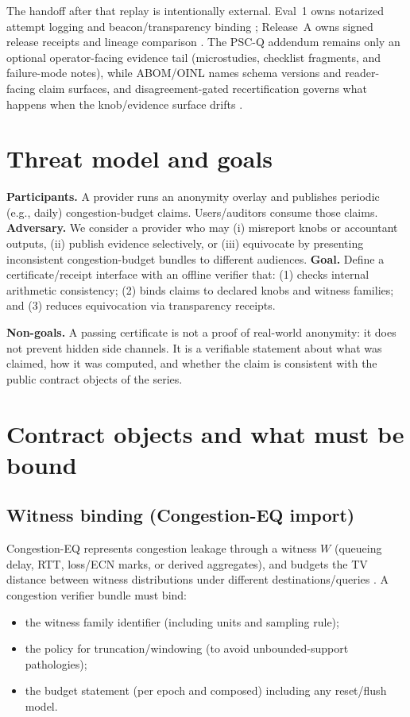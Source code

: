 \documentclass[11pt]{article}
\begin{document}
The handoff after that replay is intentionally external.
Eval~1 owns notarized attempt logging and beacon/transparency binding \cite{series:evalnotary}; Release~A owns signed release receipts and lineage comparison \cite{series:release}.
The PSC-Q addendum remains only an optional operator-facing evidence tail (microstudies, checklist fragments, and failure-mode notes), while ABOM/OINL names schema versions and reader-facing claim surfaces, and disagreement-gated recertification governs what happens when the knob/evidence surface drifts \cite{series:pscqaddendum,series:abom,series:recert}.

\section{Threat model and goals}
\textbf{Participants.}
A provider runs an anonymity overlay and publishes periodic (e.g., daily) congestion-budget claims.
Users/auditors consume those claims.
\textbf{Adversary.}
We consider a provider who may (i) misreport knobs or accountant outputs, (ii) publish evidence selectively, or (iii) equivocate by presenting inconsistent congestion-budget bundles to different audiences.
\textbf{Goal.}
Define a certificate/receipt interface with an offline verifier that:
(1) checks internal arithmetic consistency; (2) binds claims to declared knobs and witness families; and (3) reduces equivocation via transparency receipts.

\textbf{Non-goals.}
A passing certificate is not a proof of real-world anonymity: it does not prevent hidden side channels.
It is a verifiable statement about what was claimed, how it was computed, and whether the claim is consistent with the public contract objects of the series.

\section{Contract objects and what must be bound}
\subsection{Witness binding (Congestion-EQ import)}
Congestion-EQ represents congestion leakage through a witness $W$ (queueing delay, RTT, loss/ECN marks, or derived aggregates), and budgets the TV distance between witness distributions under different destinations/queries \cite{series:congeq}.
A congestion verifier bundle must bind:
\begin{itemize}[leftmargin=1.2em]
\item the witness family identifier (including units and sampling rule);
\item the policy for truncation/windowing (to avoid unbounded-support pathologies);
\item the budget statement (per epoch and composed) including any reset/flush model.
\end{itemize}
\end{document}
